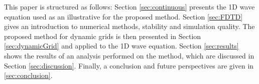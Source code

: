 


This paper is structured as follows: Section \ref{sec:continuous} presents the 1D wave equation used as an illustrative for the proposed method. Section \ref{sec:FDTD} gives an introduction to numerical methods, stability and simulation quality. The proposed method for dynamic grids is then presented in Section \ref{sec:dynamicGrid} and applied to the 1D wave equation. Section \ref{sec:results} shows the results of an analysis performed on the method, which are discussed in Section \ref{sec:discussion}. Finally, a conclusion and future perspectives are given in \ref{sec:conclusion}.
